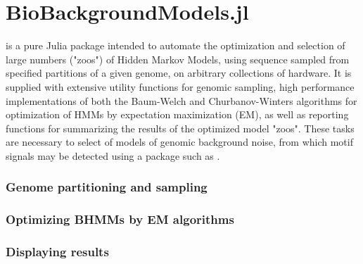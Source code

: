 \chapter{BioBackgroundModels.jl}
\label{ch:BBM}

 is a pure Julia package intended to automate the optimization and selection of large numbers ("zoos") of Hidden Markov Models, using sequence sampled from specified partitions of a given genome, on arbitrary collections of hardware. It is supplied with extensive utility functions for genomic sampling, high performance implementations of both the Baum-Welch and Churbanov-Winters algorithms for optimization of HMMs by expectation maximization (EM), as well as reporting functions for summarizing the results of the optimized model "zoos". These tasks are necessary to select of models of genomic background noise, from which motif signals may be detected using a package such as .

\subsection{Genome partitioning and sampling}

\subsection{Optimizing BHMMs by EM algorithms}

\subsection{Displaying results}